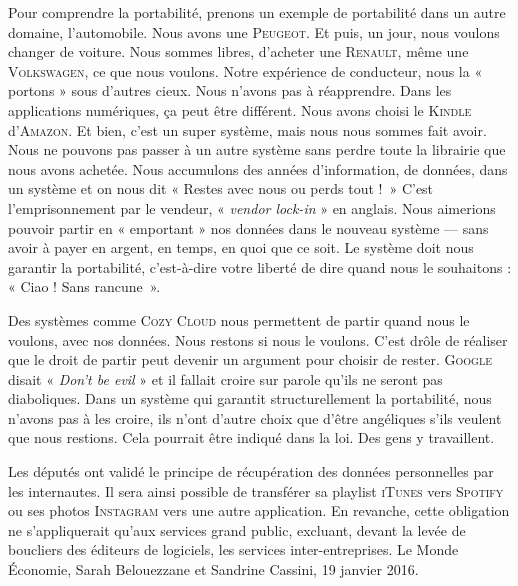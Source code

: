 Pour comprendre la portabilité, prenons un exemple de portabilité dans un autre domaine, l’automobile. Nous avons une \textsc{Peugeot}. Et puis, un jour, nous voulons changer de voiture. Nous sommes libres, d’acheter une \textsc{Renault}, même une \textsc{Volkswagen}, ce que nous voulons. Notre expérience de conducteur, nous la « portons » sous d’autres cieux. Nous n’avons pas à réapprendre. Dans les applications numériques, ça peut être différent. Nous avons choisi le \textsc{Kindle} d’\textsc{Amazon}. Et bien, c’est un super système, mais nous nous sommes fait avoir. Nous ne pouvons pas passer à un autre système sans perdre toute la librairie que nous avons achetée. Nous accumulons des années d’information, de données, dans un système et on nous dit « Restes avec nous ou perds tout !~» C’est l’emprisonnement par le vendeur, « \textit{vendor lock-in} » en anglais. Nous aimerions pouvoir partir en « emportant » nos données dans le nouveau système --- sans avoir à payer en argent, en temps, en quoi que ce soit. Le système doit nous garantir la portabilité, c’est-à-dire votre liberté de dire quand nous le souhaitons : « Ciao ! Sans rancune~».

Des systèmes comme \textsc{Cozy Cloud} nous permettent de partir quand nous le voulons, avec nos données. Nous restons si nous le voulons. C’est drôle de réaliser que le droit de partir peut devenir un argument pour choisir de rester. \textsc{Google} disait « \textit{Don’t be evil} » et il fallait croire sur parole qu’ils ne seront pas diaboliques. Dans un système qui garantit structurellement la portabilité, nous n’avons pas à les croire, ils n’ont d’autre choix que d’être angéliques s’ils veulent que nous restions. Cela pourrait être indiqué dans la loi. Des gens y travaillent.

\begin{tcolorbox}[boxrule=0pt, arc=0pt, boxsep=0pt, top=4pt, bottom=4pt, left=4pt, right=4pt]
Les députés ont validé le principe de récupération des données personnelles par les internautes. Il sera ainsi possible de transférer sa playlist \textsc{iTunes} vers \textsc{Spotify} ou ses photos \textsc{Instagram} vers une autre application. En revanche, cette obligation ne s’appliquerait qu’aux services grand public, excluant, devant la levée de boucliers des éditeurs de logiciels, les services inter-entreprises. Le Monde Économie, Sarah Belouezzane et Sandrine Cassini, 19 janvier 2016. 
\end{tcolorbox}

